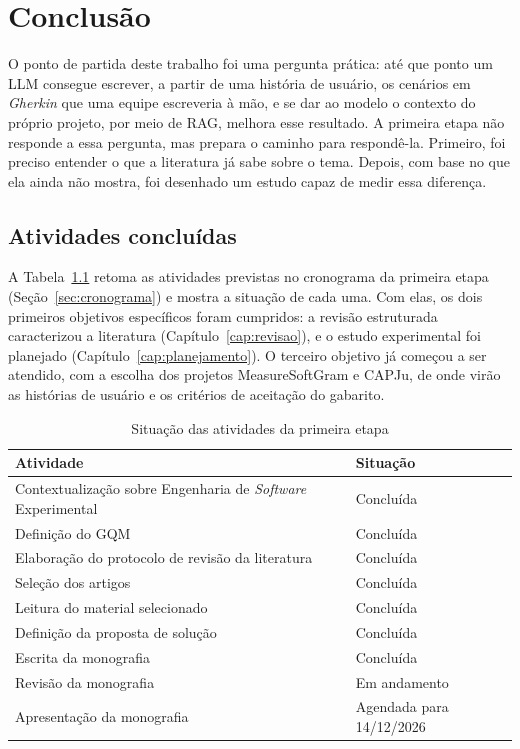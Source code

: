 \chapter[Conclusão]{Conclusão}
\label{cap:conclusao}

O ponto de partida deste trabalho foi uma pergunta prática: até que ponto um LLM consegue escrever, a partir de uma história de usuário, os cenários em \textit{Gherkin} que uma equipe escreveria à mão, e se dar ao modelo o contexto do próprio projeto, por meio de RAG, melhora esse resultado. A primeira etapa não responde a essa pergunta, mas prepara o caminho para respondê-la. Primeiro, foi preciso entender o que a literatura já sabe sobre o tema. Depois, com base no que ela ainda não mostra, foi desenhado um estudo capaz de medir essa diferença.

\section{Atividades concluídas}

A Tabela~\ref{tab:atividades-concluidas} retoma as atividades previstas no cronograma da primeira etapa (Seção~\ref{sec:cronograma}) e mostra a situação de cada uma. Com elas, os dois primeiros objetivos específicos foram cumpridos: a revisão estruturada caracterizou a literatura (Capítulo~\ref{cap:revisao}), e o estudo experimental foi planejado (Capítulo~\ref{cap:planejamento}). O terceiro objetivo já começou a ser atendido, com a escolha dos projetos MeasureSoftGram e CAPJu, de onde virão as histórias de usuário e os critérios de aceitação do gabarito.

\begin{table}[H]
  \centering
  \caption{Situação das atividades da primeira etapa}
  \label{tab:atividades-concluidas}
  \small
  \begin{tabular}{|p{}|p{}|}
    \hline
    \textbf{Atividade} & \textbf{Situação} \\ \hline
    Contextualização sobre Engenharia de \textit{Software} Experimental & Concluída \\ \hline
    Definição do GQM & Concluída \\ \hline
    Elaboração do protocolo de revisão da literatura & Concluída \\ \hline
    Seleção dos artigos & Concluída \\ \hline
    Leitura do material selecionado & Concluída \\ \hline
    Definição da proposta de solução & Concluída \\ \hline
    Escrita da monografia & Concluída \\ \hline
    Revisão da monografia & Em andamento \\ \hline
    Apresentação da monografia & Agendada para 14/12/2026 \\ \hline
  \end{tabular}
\end{table}

